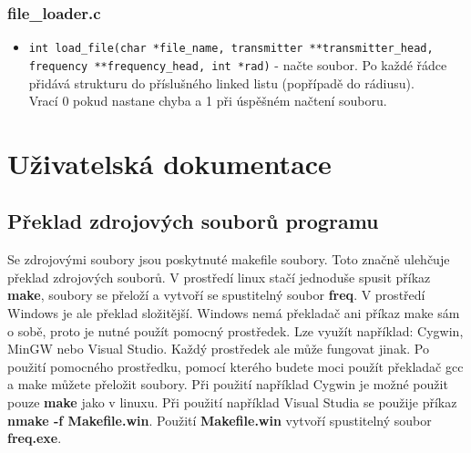 \documentclass[12pt]{article}
\begin{document}
\subsubsection{file\_loader.c}
%
\begin{itemize}
	\item \texttt{int load\_file(char *file\_name,
		transmitter **transmitter\_head,
              frequency **frequency\_head, int *rad)} - načte soubor. Po každé
		řádce přidává strukturu do příslušného linked listu (popřípadě
		do rádiusu).\\

		Vrací 0 pokud nastane chyba a 1 při úspěšném načtení souboru.
\end{itemize}
%
%

\section{Uživatelská dokumentace}
%
\subsection{Překlad zdrojových souborů programu}
Se zdrojovými soubory jsou poskytnuté makefile soubory. Toto značně ulehčuje
překlad zdrojových souborů. V prostředí linux stačí jednoduše spusit příkaz
\textbf{make}, soubory se přeloží a vytvoří se spustitelný soubor \textbf{freq}.
V prostředí Windows je ale překlad složitější. Windows nemá překladač ani 
příkaz make sám o sobě, proto je nutné použít pomocný prostředek. Lze využít 
například: Cygwin, MinGW nebo Visual Studio. Každý prostředek ale může 
fungovat jinak. Po použití pomocného prostředku, pomocí kterého budete moci 
použít překladač gcc a make můžete přeložit soubory. Při použití například 
Cygwin je možné použit pouze \textbf{make} jako v linuxu. Při použití například 
Visual Studia se použije příkaz \textbf{nmake -f Makefile.win}. Použití
\textbf{Makefile.win} vytvoří spustitelný soubor \textbf{freq.exe}.
%
\end{document}
